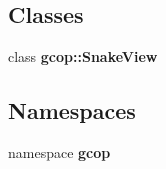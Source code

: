 \subsection*{\-Classes}
\begin{DoxyCompactItemize}
\item 
class {\bf gcop\-::\-Snake\-View}
\end{DoxyCompactItemize}
\subsection*{\-Namespaces}
\begin{DoxyCompactItemize}
\item 
namespace {\bf gcop}
\end{DoxyCompactItemize}
